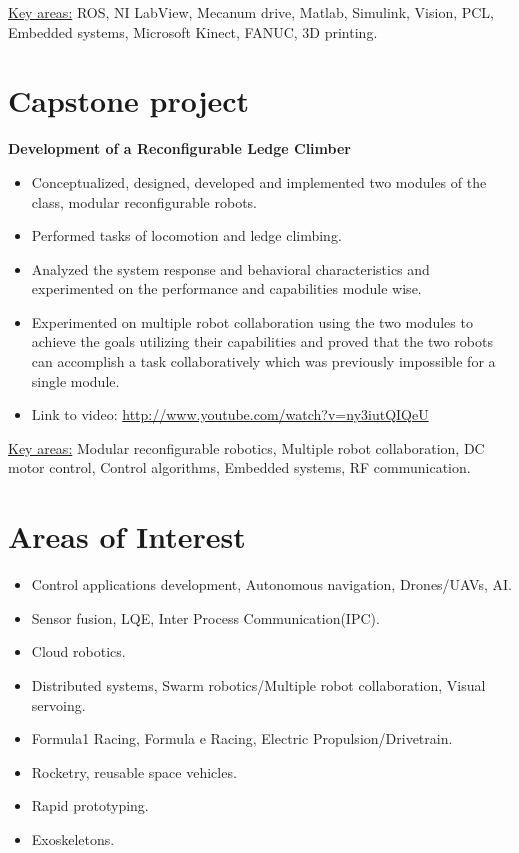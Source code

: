 \documentclass[margin]{res}
\begin{document}
\begin{resume}
\begin{itemize}
  
\end{itemize}

\underline{Key areas:} ROS,
NI LabView\textsuperscript{\ssmall{\textregistered}},
Mecanum drive,
Matlab\textsuperscript{\ssmall{\textregistered}},
Simulink\textsuperscript{\ssmall{\textregistered}},
Vision, PCL, Embedded systems,
Microsoft\textsuperscript{\ssmall{\textregistered}} Kinect,
FANUC\textsuperscript{{\ssmall\texttrademark}},
3D printing.


\section{Capstone project}
{\bf Development of a Reconfigurable Ledge Climber}
\begin{itemize} \itemsep -2pt
  \item Conceptualized, designed, developed and implemented two modules of the
  class, modular reconfigurable robots.
  \item  Performed tasks of locomotion and ledge climbing.
  \item Analyzed the system response and behavioral characteristics and
  experimented on the performance and capabilities module wise.
  \item Experimented on multiple robot collaboration using the two modules
  to achieve the goals utilizing their capabilities and proved that the two robots
  can accomplish a task collaboratively which was previously impossible for a
  single module.
  \item[] Link to video: \url{http://www.youtube.com/watch?v=ny3iutQIQeU}
  
\end{itemize}
\underline{Key areas:}  Modular reconfigurable robotics, Multiple robot
collaboration, DC motor control, Control algorithms, Embedded systems, RF
communication.

\section{Areas of Interest}
\begin{itemize} \itemsep -2pt
  \item Control applications development, Autonomous navigation, 
        Drones/UAVs, AI.
  \item Sensor fusion, LQE, Inter Process Communication(IPC).
  \item Cloud robotics.
  \item Distributed systems, Swarm robotics/Multiple robot collaboration,
        Visual servoing.
  \item Formula1 Racing, Formula e Racing,  Electric Propulsion/Drivetrain.
  \item Rocketry, reusable space vehicles.
  \item Rapid prototyping.
  \item Exoskeletons.
  

\end{itemize}
\end{resume}
\end{document}
